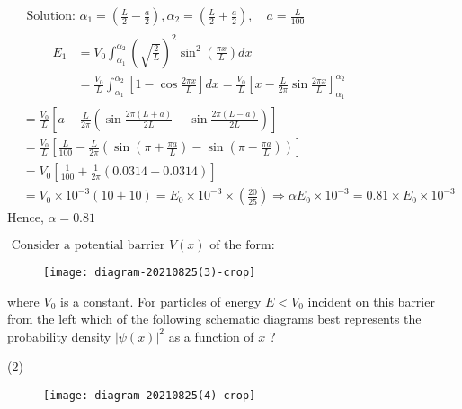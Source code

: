 \begin{enumerate}
\begin{minipage}{\textwidth}
	\end{minipage}
	\begin{answer}
		$\begin{aligned}
		&\text { Solution: } \alpha_{1}=\left(\frac{L}{2}-\frac{a}{2}\right), \alpha_{2}=\left(\frac{L}{2}+\frac{a}{2}\right), \quad a=\frac{L}{100} \\
		&\qquad \begin{aligned}
		E_{1} &=V_{0} \int_{\alpha_{1}}^{\alpha_{2}}\left(\sqrt{\frac{2}{L}}\right)^{2} \sin ^{2}\left(\frac{\pi x}{L}\right) d x \\
		&=\frac{V_{0}}{L} \int_{\alpha_{1}}^{\alpha_{2}}\left[1-\cos \frac{2 \pi x}{L}\right] d x=\frac{V_{0}}{L}\left[x-\frac{L}{2 \pi} \sin \frac{2 \pi x}{L}\right]_{\alpha_{1}}^{\alpha_{2}}
		\end{aligned}
		\end{aligned}$
		$$
		\begin{aligned}
		&=\frac{V_{0}}{L}\left[a-\frac{L}{2 \pi}\left(\sin \frac{2 \pi(L+a)}{2 L}-\sin \frac{2 \pi(L-a)}{2 L}\right)\right] \\
		&=\frac{V_{0}}{L}\left[\frac{L}{100}-\frac{L}{2 \pi}\left(\sin \left(\pi+\frac{\pi a}{L}\right)-\sin \left(\pi-\frac{\pi a}{L}\right)\right)\right] \\
		&=V_{0}\left[\frac{1}{100}+\frac{1}{2 \pi}(0.0314+0.0314)\right] \\
		&=V_{0} \times 10^{-3}(10+10)=E_{0} \times 10^{-3} \times\left(\frac{20}{25}\right) \Rightarrow \alpha E_{0} \times 10^{-3}=0.81 \times E_{0} \times 10^{-3}
		\end{aligned}
		$$
		Hence, $\alpha=0.81$	
	\end{answer}
	\begin{minipage}{\textwidth}
		\item $ \text { Consider a potential barrier } V(x) \text { of the form: }$
		\begin{figure}[H]
			\centering
			\texttt{[image: diagram-20210825(3)-crop]}
		\end{figure}
		where $V_{0}$ is a constant. For particles of energy $E<V_{0}$ incident on this barrier from the left which of the following schematic diagrams best represents the probability density $|\psi(x)|^{2}$ as a function of $x$ ?
	\end{minipage}
	\begin{tasks}(2)
		\task[\textbf{A.}]\begin{figure}[H]
			\centering
			\texttt{[image: diagram-20210825(4)-crop]}

\end{figure}
\end{tasks}
\end{enumerate}
